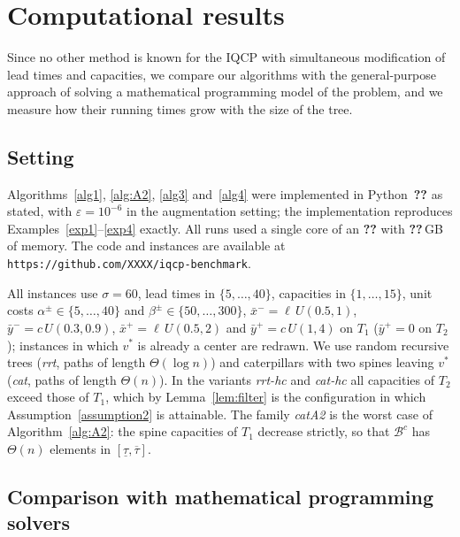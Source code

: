 \section{Computational results}
\label{sec:comp}

Since no other method is known for the IQCP with simultaneous modification of
lead times and capacities, we compare our algorithms with the general-purpose
approach of solving a mathematical programming model of the problem, and we
measure how their running times grow with the size of the tree.

\subsection{Setting}

Algorithms~\ref{alg1}, \ref{alg:A2}, \ref{alg3} and~\ref{alg4} were
implemented in Python~\textbf{??} %
as stated, with $\varepsilon=10^{-6}$ in the augmentation setting; the
implementation reproduces Examples~\ref{exp1}--\ref{exp4} exactly. All runs
used a single core of an \textbf{??} %
with \textbf{??}\,GB of memory. %
The code and instances are available at
\texttt{https://github.com/XXXX/iqcp-benchmark}. %

All instances use $\sigma=60$, lead times in $\{5,\dots,40\}$, capacities in
$\{1,\dots,15\}$, unit costs $\alpha^\pm\in\{5,\dots,40\}$ and
$\beta^\pm\in\{50,\dots,300\}$, $\bar x^-=\ell\,U(0.5,1)$,
$\bar y^-=c\,U(0.3,0.9)$, $\bar x^+=\ell\,U(0.5,2)$ and $\bar y^+=c\,U(1,4)$ on
$T_1$ ($\bar y^+=0$ on $T_2$); instances in which $v^*$ is already a center are
redrawn. We use random recursive trees (\emph{rrt}, paths of length
$\Theta(\log n)$) and caterpillars with two spines leaving $v^*$ (\emph{cat},
paths of length $\Theta(n)$). In the variants \emph{rrt-hc} and \emph{cat-hc}
all capacities of $T_2$ exceed those of $T_1$, which by
Lemma~\ref{lem:filter} is the configuration in which
Assumption~\ref{assumption2} is attainable. The family \emph{catA2} is the
worst case of Algorithm~\ref{alg:A2}: the spine capacities of $T_1$ decrease
strictly, so that $\mathcal B^c$ has $\Theta(n)$ elements in
$[\underline\tau,\overline\tau]$.

\subsection{Comparison with mathematical programming solvers}
\label{subsec:comp-gurobi}

